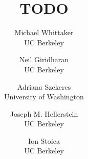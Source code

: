 \documentclass[letterpaper,twocolumn,10pt]{article}
\begin{document}
\date{}

\title{TODO}

\author{%
{\rm Michael Whittaker}\\
UC Berkeley
\and
{\rm Neil Giridharan}\\
UC Berkeley
\and
{\rm Adriana Szekeres}\\
University of Washington
\and
{\rm Joseph M. Hellerstein}\\
UC Berkeley
\and
{\rm Ion Stoica}\\
UC Berkeley
}

\maketitle

{}
{}
{}
{}
{}
{}
{}
{}
{}
{}



\end{document}
